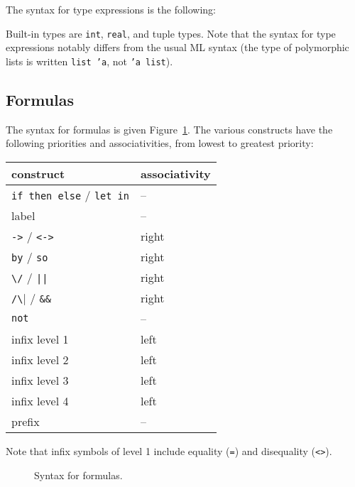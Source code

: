 The syntax for type expressions is the following:
\begin{center}\framebox{}\end{center}
Built-in types are \texttt{int}, \texttt{real}, and tuple types.
Note that the syntax for type
expressions notably differs from the usual ML syntax (\eg the
type of polymorphic lists is written \texttt{list 'a}, not \texttt{'a list}).


\subsection{Formulas}

The syntax for formulas is given Figure~\ref{fig:bnf:formula}.
The various constructs have the following priorities and
associativities, from lowest to greatest priority:
\begin{center}
  \begin{tabular}{|l|l|}
    \hline
    construct & associativity \\
    \hline\hline
    \texttt{if then else} / \texttt{let in} & -- \\
    label & -- \\
    \texttt{->} / \texttt{<->} & right \\
    \texttt{by} / \texttt{so} & right \\
    \verb!\/! / \verb!||! & right \\
    \verb|/\| / \verb!&&! & right \\
    \texttt{not}  & -- \\
    infix level 1 & left \\
    infix level 2 & left \\
    infix level 3 & left \\
    infix level 4 & left \\
    prefix        & --   \\
    \hline
  \end{tabular}
\end{center}
Note that infix symbols of level 1 include equality (\texttt{=}) and
disequality (\texttt{<>}).

\begin{figure}
  \begin{center}\framebox{}\end{center}
  \caption{Syntax for formulas.}
\label{fig:bnf:formula}
\end{figure}

